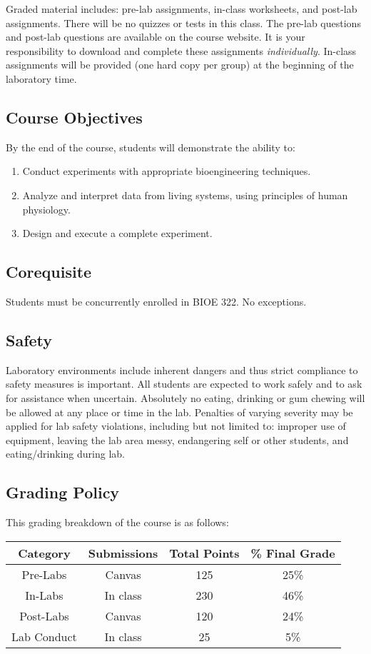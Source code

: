 \documentclass{article}
\begin{document}
Graded material includes: pre-lab assignments, in-class worksheets, and post-lab assignments.  There will be no quizzes or tests in this class. The pre-lab questions and post-lab questions are available on the course website. It is your responsibility to download and complete these assignments \textit{individually}. In-class assignments will be provided (one hard copy per group) at the beginning of the laboratory time.

\subsection*{Course Objectives}
By the end of the course, students will demonstrate the ability to:
\begin{enumerate}
	\item Conduct experiments with appropriate bioengineering techniques.
	\item Analyze and interpret data from living systems, using principles of human physiology.
	\item Design and execute a complete experiment.
\end{enumerate}

\subsection*{Corequisite}
Students must be concurrently enrolled in BIOE 322. No exceptions.

\subsection*{Safety}
Laboratory environments include inherent dangers and thus strict compliance to safety measures is important. All students are expected to work safely and to ask for assistance when uncertain. Absolutely no eating, drinking or gum chewing will be allowed at any place or time in the lab. Penalties of varying severity may be applied for lab safety violations, including but not limited to: improper use of equipment, leaving the lab area messy, endangering self or other students, and eating/drinking during lab.

\subsection*{Grading Policy}

This grading breakdown of the course is as follows:
\begin{table}[h!]
	\centering
\begin{tabular}[h!]{cccc}
\toprule
	Category & Submissions & Total Points & \% Final Grade\\
	\midrule
	Pre-Labs & Canvas & 125 & 25\%\\
	In-Labs & In class & 230 & 46\%\\
	Post-Labs & Canvas & 120 & 24\%\\
	Lab Conduct & In class & 25 & 5\%\\
	\bottomrule
\end{tabular}
\end{table}
\end{document}
